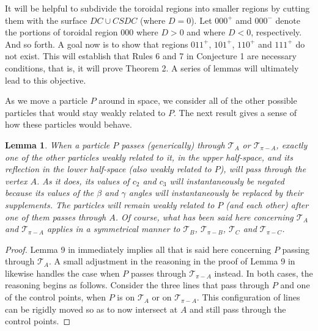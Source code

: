 \documentclass[a4paper, twoside]{article}
\newtheorem{lemma}{Lemma}
\begin{document}
It will be helpful to subdivide the toroidal regions into smaller regions by cutting them with the surface $DC \cup CSDC$ (where $D = 0$). Let $000^+$ amd $000^-$ denote the portions of toroidal region $000$ where $D > 0$ and where $D < 0$, respectively. And so forth. A goal now is to show that regions $011^+$, $101^+$, $110^+$ and $111^+$ do not exist. This will establish that Rules 6 and 7 in Conjecture 1 are necessary conditions, that is, it will prove Theorem 2. A series of lemmas will ultimately lead to this objective. 


As we move a particle $P$ around in space, we consider all of the other possible particles that would stay weakly related to $P$. The next result gives a sense of how these particles would behave. 

\vspace{2mm}

\begin{lemma}

When a particle $P$ passes (generically) through $\mathcal{T}_A$ or $\mathcal{T}_{\pi-A}$, exactly one of the other particles weakly related to it, in the upper half-space, and its reflection in the lower half-space (also weakly related to $P$), will pass through the vertex $A$. As it does, its values of $c_2$ and $c_3$ will instantaneously be negated because its values of the $\beta$ and $\gamma$ angles will instantaneously be replaced by their supplements. The particles will remain weakly related to $P$ (and each other) after one of them passes through $A$. Of course, what has been said here concerning $\mathcal{T}_A$ and $\mathcal{T}_{\pi-A}$ applies in a symmetrical manner to $\mathcal{T}_B$, $\mathcal{T}_{\pi-B}$, $\mathcal{T}_C$ and $\mathcal{T}_{\pi-C}$. 

\end{lemma}

\begin{proof}

Lemma 9 in \cite{RW} immediately implies all that is said here concerning $P$ passing through $\mathcal{T}_A$. A small adjustment in the reasoning in the proof of Lemma 9 in \cite{RW} likewise handles the case when $P$ passes through $\mathcal{T}_{\pi-A}$ instead. In both cases, the reasoning begins as follows. Consider the three lines that pass through $P$ and one of the control points, when $P$ is on $\mathcal{T}_A$ or on $\mathcal{T}_{\pi-A}$. This configuration of lines can be rigidly moved so as to now intersect at $A$ and still pass through the control points. 

\end{proof}
\end{document}
